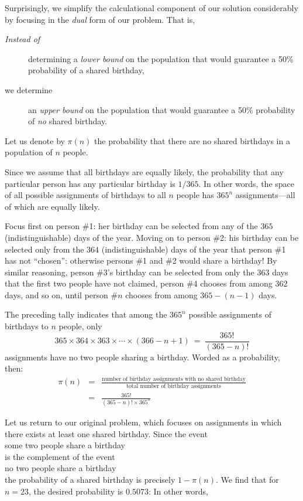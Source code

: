 \bigskip

Surprisingly, we simplify the calculational component of our solution
considerably by focusing in the {\em dual}  form
of our problem.  That is,
\begin{description}
\item[{\em Instead of}]
 determining a {\em lower bound} on the population
that would guarantee a 50\% probability of a shared birthday,
\item[we determine]
an {\em upper bound} on the population that would
guarantee a 50\% probability of {\em no} shared birthday.
\end{description}
Let us denote by $\pi(n)$ the probability that there are no shared
birthdays in a population of $n$ people.

Since we assume that all birthdays are equally likely, the probability
that any particular person has any particular birthday is $1/365$.  In
other words, the space of all possible assignments of birthdays to all
$n$ people has $365^n$ assignments---all of which are equally likely.

Focus first on person \#1: her birthday can be selected from any of
the $365$ (indistinguishable) days of the year.  Moving on to person
\#2: his birthday can be selected only from the $364$
(indistinguishable) days of the year that person \#1 has not
``chosen'': otherwise persons \#1 and \#2 would share a birthday!  By
similar reasoning, person \#3's birthday can be selected from only the
$363$ days that the first two people have not claimed, person \#4
chooses from among $362$ days, and so on, until person \#$n$ chooses
from among $365-(n-1)$ days.

The preceding tally indicates that among the $365^n$ possible
assignments of birthdays to $n$ people, only
\[ 365 \times 364 \times 363 \times \cdots \times
(366-n+1) \ = \ \frac{365!}{(365-n)!} 
\]
assignments have no two people sharing a birthday.  Worded as a
probability, then:
\begin{eqnarray*}
\pi(n) & = &
\frac{\mbox{number of birthday assignments with no shared birthday}}
{\mbox{total number of birthday assignments}} \\
 &  = & \frac{365!}{ (365-n)!  \times 365^n}
\end{eqnarray*}

\medskip

Let us return to our original problem, which focuses on assignments in
which there exists at least one shared birthday.  Since the event \\
\hspace*{.25in}some two people share a birthday \\
is the complement of the event \\
\hspace*{.25in}no two people share a birthday \\
the probability of a shared birthday is precisely $1-\pi(n)$.  We find
that for $n=23$, the desired probability is $0.5073$:  In other words,

